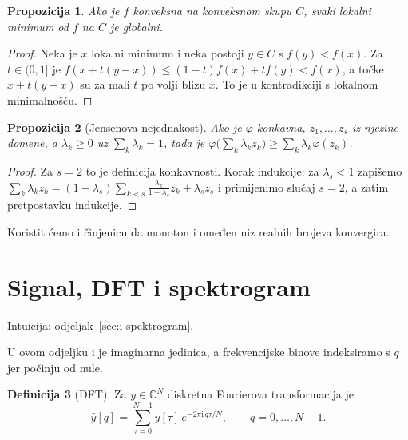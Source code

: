 \documentclass[11pt,a4paper]{article}
\theoremstyle{definition}
\newtheorem{definicija}{Definicija}[section]
\theoremstyle{plain}
\newtheorem{propozicija}[definicija]{Propozicija}
\theoremstyle{remark}
\newcommand{\iu}{\mathrm{i}}
\newcommand{\intuicija}[1]{{\small\color{muted}\sffamily Intuicija: odjeljak~\ref{#1}.}\par}
\begin{document}
\begin{propozicija}\label{prop:lokalni-globalni}
Ako je $f$ konveksna na konveksnom skupu $C$, svaki lokalni minimum od $f$ na $C$ je globalni.
\end{propozicija}
\begin{proof}
Neka je $x$ lokalni minimum i neka postoji $y\in C$ s $f(y)<f(x)$. Za $t\in(0,1]$ je
$f(x+t(y-x))\leq(1-t)f(x)+tf(y)<f(x)$, a točke $x+t(y-x)$ su za mali $t$ po volji blizu $x$.
To je u kontradikciji s lokalnom minimalnošću.
\end{proof}

\begin{propozicija}[Jensenova nejednakost]\label{prop:jensen}
Ako je $\varphi$ konkavna, $z_1,\dots,z_s$ iz njezine domene, a $\lambda_k\geq0$ uz
$\sum_k\lambda_k=1$, tada je $\varphi\bigl(\sum_k\lambda_kz_k\bigr)\geq\sum_k\lambda_k\varphi(z_k)$.
\end{propozicija}
\begin{proof}
Za $s=2$ to je definicija konkavnosti. Korak indukcije: za $\lambda_s<1$ zapišemo
$\sum_k\lambda_kz_k=(1-\lambda_s)\sum_{k<s}\frac{\lambda_k}{1-\lambda_s}z_k+\lambda_sz_s$ i primijenimo
slučaj $s=2$, a zatim pretpostavku indukcije.
\end{proof}

Koristit ćemo i činjenicu da monoton i omeđen niz realnih brojeva konvergira.

\section{Signal, DFT i spektrogram}\label{sec:f-signal}
\intuicija{sec:i-spektrogram}

U ovom odjeljku $\iu$ je imaginarna jedinica, a frekvencijske binove indeksiramo s $q$ jer počinju
od nule.

\begin{definicija}[DFT]
Za $y\in\mathbb{C}^N$ diskretna Fourierova transformacija je
\[
  \hat y[q]=\sum_{\tau=0}^{N-1}y[\tau]\,e^{-2\pi\iu\,q\tau/N},\qquad q=0,\dots,N-1.
\]
\end{definicija}
\end{document}
